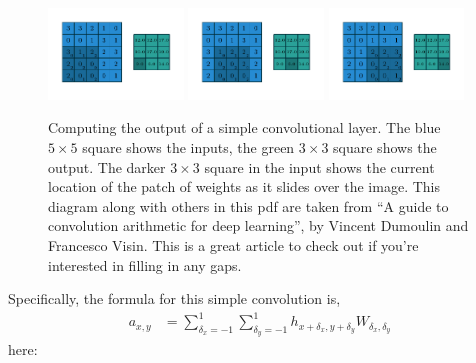 \documentclass{article}
\begin{document}
\begin{figure}[H]
    \includegraphics[width=0.32\textwidth]{pdf/numerical_no_padding_no_strides_06.pdf}
    \includegraphics[width=0.32\textwidth]{pdf/numerical_no_padding_no_strides_07.pdf}
    \includegraphics[width=0.32\textwidth]{pdf/numerical_no_padding_no_strides_08.pdf}
    \caption{\label{fig:numerical_no_padding_no_strides} 
      Computing the output of a simple convolutional layer.  The blue $5 \times 5$ square shows the inputs, the green $3 \times 3$ square shows the output.  The darker $3\times 3$ square in the input shows the current location of the patch of weights as it slides over the image.  This diagram along with others in this pdf are taken from ``A guide to convolution arithmetic for deep learning'', by Vincent Dumoulin and Francesco Visin.  This is a great article to check out if you're interested in filling in any gaps.
    }
\end{figure}
Specifically, the formula for this simple convolution is,
\begin{align}
  \label{eq:conv2d_scalar}
  a_{x,y} &= \sum_{\delta_x=-1}^1 \sum_{\delta_y=-1}^1 h_{x+\delta_x, y+\delta_y} W_{\delta_x, \delta_y}
\end{align}
here:
\end{document}
